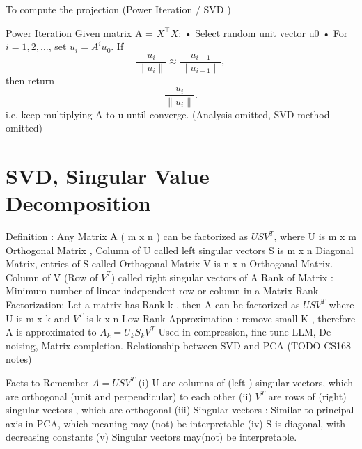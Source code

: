 \documentclass{article}
\begin{document}
To compute the projection (Power Iteration / SVD )

 Power Iteration
 Given matrix A =  \(X^\top X\):
 • Select random unit vector u0 \newline
 • For \( i = 1, 2, \dots \), set \( u_i = A^i u_0 \). If 
\[
\frac{u_i}{\|u_i\|} \approx \frac{u_{i-1}}{\|u_{i-1}\|},
\]
then return 
\[
\frac{u_i}{\|u_i\|}.
\]
i.e. keep multiplying  A to u until converge. (Analysis omitted, SVD method omitted)

\section{SVD, Singular Value Decomposition}

Definition : Any Matrix A ( m x n ) can be factorized as \(USV^T\), where \newline
U is m x m Orthogonal Matrix , Column of U called left singular vectors \newline
S is m x n Diagonal Matrix, entries of S called Orthogonal Matrix \newline
V is n x n  Orthogonal Matrix. Column of  V (Row of \(V^T\)) called right singular vectors of A \newline
\newline
\newline
Rank of Matrix : Minimum number of linear independent row or column in a Matrix \newline 
Rank Factorization: Let a matrix has Rank k , then A can be factorized as \(USV^T\) \newline 
where U is m x k and \(V^T\) is k x n \newline 
Low Rank Approximation : remove small K , therefore A is approximated to \(A_k =U_kS_kV^T\) \newline
Used in compression, fine tune LLM, De-noising, Matrix completion. \newline
Relationship between SVD and PCA (TODO CS168 notes) \newline

Facts to Remember \(A=USV^T\) \newline 
(i) U are columns of (left ) singular vectors, which are orthogonal (unit and perpendicular) to each other  \newline
(ii) \(V^T\) are rows of (right) singular vectors , which are orthogonal  \newline
(iii)  Singular vectors : Similar to principal axis in PCA, which meaning may (not) be interpretable\newline
(iv) S is diagonal, with decreasing constants\newline 
(v) Singular vectors may(not) be interpretable. \newline
\end{document}
